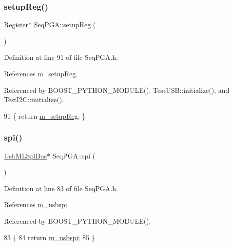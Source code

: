 \subsubsection{\texorpdfstring{setup\+Reg()}{setupReg()}}
{\footnotesize\ttfamily \hyperlink{classRegister}{Register}$\ast$ Seq\+P\+G\+A\+::setup\+Reg (\begin{DoxyParamCaption}{ }\end{DoxyParamCaption})\hspace{0.3cm}{\ttfamily [inline]}}



Definition at line 91 of file Seq\+P\+G\+A.\+h.



References m\+\_\+setup\+Reg.



Referenced by B\+O\+O\+S\+T\+\_\+\+P\+Y\+T\+H\+O\+N\+\_\+\+M\+O\+D\+U\+L\+E(), Test\+U\+S\+B\+::initialize(), and Test\+I2\+C\+::initialize().


\begin{DoxyCode}
91 \{ \textcolor{keywordflow}{return} \hyperlink{classSeqPGA_a03269241e7fc26493cd0595beda334c2}{m\_setupReg};  \}
\end{DoxyCode}
\mbox{\label{classSeqPGA_a9c6993bb241b4cc474d525f65696099a}} 
\subsubsection{\texorpdfstring{spi()}{spi()}}
{\footnotesize\ttfamily \hyperlink{classUsbMLSpiBus}{Usb\+M\+L\+Spi\+Bus}$\ast$ Seq\+P\+G\+A\+::spi (\begin{DoxyParamCaption}{ }\end{DoxyParamCaption})\hspace{0.3cm}{\ttfamily [inline]}}



Definition at line 83 of file Seq\+P\+G\+A.\+h.



References m\+\_\+usbspi.



Referenced by B\+O\+O\+S\+T\+\_\+\+P\+Y\+T\+H\+O\+N\+\_\+\+M\+O\+D\+U\+L\+E().


\begin{DoxyCode}
83                     \{
84     \textcolor{keywordflow}{return} \hyperlink{classSeqPGA_aeb7d559e042bced959366125781cef39}{m\_usbspi};
85   \}
\end{DoxyCode}
\mbox{\label{classSeqPGA_af31a6428f365c1f8ded0ee381d249cde}} 
